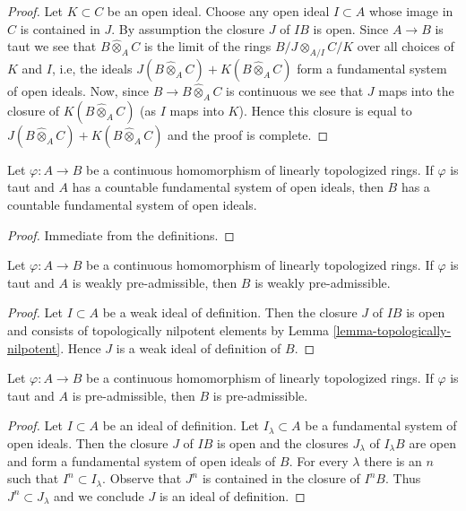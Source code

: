 \begin{proof}
Let $K \subset C$ be an open ideal. Choose any open ideal $I \subset A$
whose image in $C$ is contained in $J$. By assumption the closure $J$
of $IB$ is open. Since $A \to B$ is taut we see that
$B \widehat{\otimes}_A C$ is the limit of the rings $B/J \otimes_{A/I} C/K$
over all choices of $K$ and $I$, i.e,
the ideals $J(B \widehat{\otimes}_A C) + K(B \widehat{\otimes}_A C)$
form a fundamental system of open ideals. Now,
since $B \to B \widehat{\otimes}_A C$ is continuous we see
that $J$ maps into the closure of $K(B \widehat{\otimes}_A C)$
(as $I$ maps into $K$). Hence this closure is equal to
$J(B \widehat{\otimes}_A C) + K(B \widehat{\otimes}_A C)$
and the proof is complete.
\end{proof}

\begin{lemma}
\label{lemma-taut-ascent-countable}
Let $\varphi : A \to B$ be a continuous homomorphism of
linearly topologized rings. If $\varphi$ is taut and $A$
has a countable fundamental system of open ideals, then
$B$ has a countable fundamental system of open ideals.
\end{lemma}

\begin{proof}
Immediate from the definitions.
\end{proof}

\begin{lemma}
\label{lemma-taut-ascent-weakly-admissible}
Let $\varphi : A \to B$ be a continuous homomorphism of
linearly topologized rings. If $\varphi$ is taut and $A$
is weakly pre-admissible, then $B$ is weakly pre-admissible.
\end{lemma}

\begin{proof}
Let $I \subset A$ be a weak ideal of definition. Then the closure
$J$ of $IB$ is open and consists of topologically nilpotent elements
by Lemma \ref{lemma-topologically-nilpotent}. Hence $J$ is a weak
ideal of definition of $B$.
\end{proof}

\begin{lemma}
\label{lemma-taut-ascent-admissible}
Let $\varphi : A \to B$ be a continuous homomorphism of
linearly topologized rings. If $\varphi$ is taut and $A$
is pre-admissible, then $B$ is pre-admissible.
\end{lemma}

\begin{proof}
Let $I \subset A$ be an ideal of definition. Let
$I_\lambda \subset A$ be a fundamental system of open ideals.
Then the closure $J$ of $IB$ is open and the
closures $J_\lambda$ of $I_\lambda B$ are open and form a
fundamental system of open ideals of $B$.
For every $\lambda$ there is an $n$ such that $I^n \subset I_\lambda$.
Observe that $J^n$ is contained in the closure of $I^nB$.
Thus $J^n \subset J_\lambda$ and we conclude $J$ is an
ideal of definition.
\end{proof}

